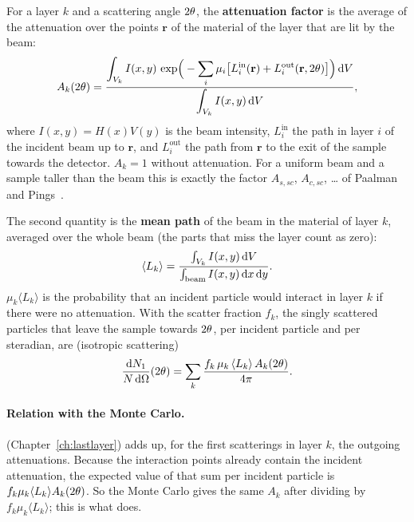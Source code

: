 For a layer $k$ and a scattering angle $2\theta$, the \textbf{attenuation factor} is the average of the attenuation over the points $\mathbf r$ of the
material of the layer that are lit by the beam:
\begin{equation}
  A_k(2\theta)=\frac{\displaystyle\int_{V_k} I(x,y)\,\exp\!\Big(-\sum_i\mu_i\big[L^{\mathrm{in}}_i(\mathbf r)+L^{\mathrm{out}}_i(\mathbf r,2\theta)\big]\Big)\,\mathrm{d}V}
                     {\displaystyle\int_{V_k} I(x,y)\,\mathrm{d}V},
  \label{eq:Ak}
\end{equation}
where $I(x,y)=H(x)V(y)$ is the beam intensity, $L^{\mathrm{in}}_i$ the path in layer $i$ of the incident beam up to $\mathbf r$, and
$L^{\mathrm{out}}_i$ the path from $\mathbf r$ to the exit of the sample towards the detector. $A_k=1$ without attenuation. For a uniform beam and a
sample taller than the beam this is exactly the factor $A_{s,sc}$, $A_{c,sc}$, \dots{} of Paalman and Pings~\cite{pp}.

The second quantity is the \textbf{mean path} of the beam in the material of layer $k$, averaged over the whole beam (the parts that miss the layer
count as zero):
\begin{equation}
  \langle L_k\rangle=\frac{\int_{V_k} I(x,y)\,\mathrm{d}V}{\int_{\text{beam}} I(x,y)\,\mathrm{d}x\,\mathrm{d}y}.
\end{equation}
$\mu_k\langle L_k\rangle$ is the probability that an incident particle would interact in layer $k$ if there were no attenuation. With the scatter
fraction $f_k$, the singly scattered particles that leave the sample towards $2\theta$, per incident particle and per steradian, are (isotropic
scattering)
\begin{equation}
  \frac{\mathrm{d}N_1}{N\,\mathrm{d}\Omega}(2\theta)=\sum_k\frac{f_k\,\mu_k\,\langle L_k\rangle\,A_k(2\theta)}{4\pi}.
  \label{eq:single-sr}
\end{equation}

\paragraph{Relation with the Monte Carlo.}  (Chapter~\ref{ch:lastlayer}) adds up, for the first scatterings in
layer $k$, the outgoing attenuations. Because the interaction points already contain the incident attenuation, the expected value of that sum per
incident particle is $f_k\mu_k\langle L_k\rangle A_k(2\theta)$. So the Monte Carlo gives the same $A_k$ after dividing by
$f_k\mu_k\langle L_k\rangle$; this is what  does.

